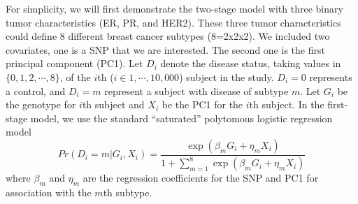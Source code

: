 \documentclass[11pt,]{article}
\begin{document}
For simplicity, we will first demonstrate the two-stage model with three
binary tumor characteristics (ER, PR, and HER2). These three tumor
characteristics could define 8 different breast cancer subtypes
(8=2x2x2). We included two covariates, one is a SNP that we are
interested. The second one is the first principal component (PC1). Let
\(D_{i}\) denote the disease status, taking values in
\(\{0,1,2,\cdots,8\}\), of the \(i\)th (\(i \in 1, \cdots, 10,000\))
subject in the study. \(D_{i}=0\) represents a control, and \(D_{i}=m\)
represent a subject with disease of subtype \(m\). Let \(G_i\) be the
genotype for \(i\)th subject and \(X_i\) be the PC1 for the \(i\)th
subject. In the first-stage model, we use the standard ``saturated''
polytomous logistic regression model
\[ Pr(D_{i}=m|G_i,X_{i})=\frac{\exp(\beta_m G_i+\eta_m X_i)}{1+\sum_{m=1}^{8}\exp(\beta_m G_i+\eta_{m}X_{i})}\]
where \(\beta_{m}\) and \(\eta_{m}\) are the regression coefficients for
the SNP and PC1 for association with the \(m\)th subtype.
\end{document}
